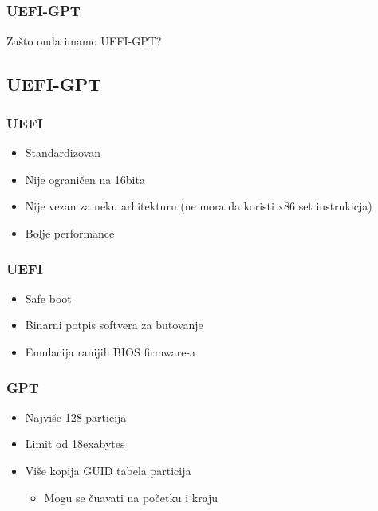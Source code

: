 \documentclass{beamer}
\begin{document}
\subsection*{}

\begin{frame}
    \frametitle{UEFI-GPT}
    \begin{center}
        \LARGE{Zašto onda imamo UEFI-GPT?}
    \end{center}
\end{frame}

\subsection*{UEFI-GPT}
\begin{frame}
    \frametitle{UEFI}
    \begin{itemize}
        \item Standardizovan \newline
        \item Nije ograničen na 16bita \newline
        \item Nije vezan za neku arhitekturu (ne mora da koristi x86 set instrukicja)\newline
        \item Bolje performance 
    \end{itemize}
\end{frame}

\begin{frame}
    \frametitle{UEFI}
    \begin{itemize}
        \item Safe boot \newline
        \item Binarni potpis softvera za butovanje \newline
        \item Emulacija ranijih BIOS firmware-a
    \end{itemize}
\end{frame}

\begin{frame}
    \frametitle{GPT}
    \begin{itemize}
        \item Najviše 128 particija \newline
        \item Limit od 18exabytes \newline
        \item Više kopija GUID tabela particija \begin{itemize}
            \item Mogu se čuavati na početku i kraju
        \end{itemize}
    \end{itemize}
\end{frame}
\end{document}
